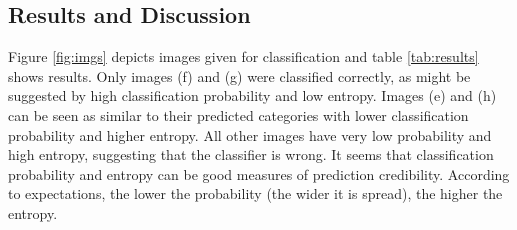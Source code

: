 \documentclass[journal, a4paper]{IEEEtran}
\begin{document}
  \subsection{Results and Discussion}
    Figure \ref{fig:imgs} depicts images given for classification and table \ref{tab:results} shows results. Only images (f) and (g) were classified correctly, as might be suggested by high classification probability and low entropy. Images (e) and (h) can be seen as similar to their predicted categories with lower classification probability and higher entropy. All other images have very low probability and high entropy, suggesting that the classifier is wrong. It seems that classification probability and entropy can be good measures of prediction credibility. According to expectations, the lower the probability (the wider it is spread), the higher the entropy.
\end{document}
